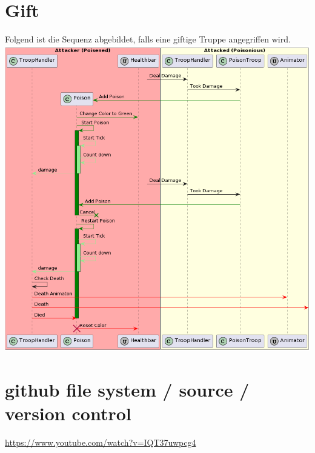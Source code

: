\section{Gift}
Folgend ist die Sequenz abgebildet, falls eine giftige Truppe angegriffen wird. \\
\includegraphics[width=15cm]{resources/Poison.png} \\


\section*{github file system / source / version control}
\url{https://www.youtube.com/watch?v=IQT37uwpcg4}